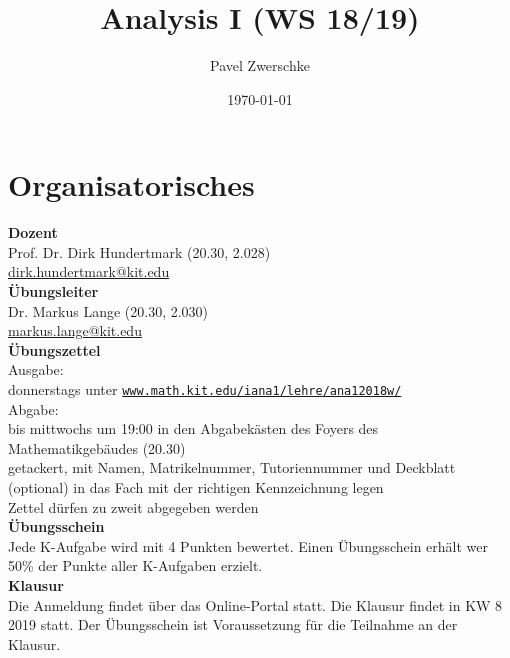 \documentclass[12pt,a4paper,titlepage]{article} %
\begin{document}
\title{Analysis I (WS 18/19)}
\date{\today}
\author{Pavel Zwerschke}
\maketitle

\tableofcontents
\newpage

\setcounter{section}{-1}
\section{Organisatorisches}
\textbf{Dozent}\\
Prof. Dr. Dirk Hundertmark (20.30, 2.028)\\
\href{mailto:dirk.hundertmark@kit.edu}{dirk.hundertmark@kit.edu}\\
\textbf{Übungsleiter}\\
Dr. Markus Lange (20.30, 2.030)\\
\href{mailto:markus.lange@kit.edu}{markus.lange@kit.edu}\\
\textbf{Übungszettel}\\
Ausgabe:\\
donnerstags unter \href{http://www.math.kit.edu/iana1/lehre/ana12018w/}{\texttt{www.math.kit.edu/iana1/lehre/ana12018w/}}\\
Abgabe:\\
bis mittwochs um 19:00 in den Abgabekästen des Foyers des Mathematikgebäudes (20.30)\\
getackert, mit Namen, Matrikelnummer, Tutoriennummer und Deckblatt (optional) in das Fach mit der richtigen Kennzeichnung legen\\
Zettel dürfen zu zweit abgegeben werden\\
\textbf{Übungsschein}\\
Jede K-Aufgabe wird mit 4 Punkten bewertet. Einen Übungsschein erhält wer 50\% der Punkte aller K-Aufgaben erzielt.\\
\textbf{Klausur}\\
Die Anmeldung findet über das Online-Portal statt. Die Klausur findet in KW 8 2019 statt. Der Übungsschein ist Voraussetzung für die Teilnahme an der Klausur.

\newpage
\end{document}
